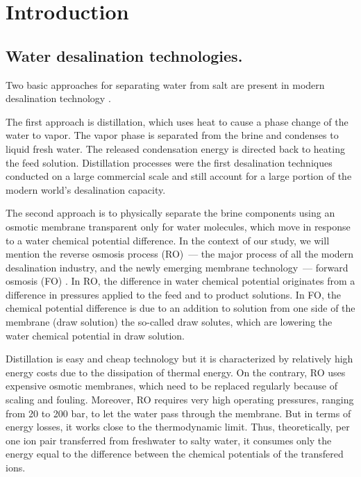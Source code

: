 \documentclass[journal,article,submit,pdftex,moreauthors]{Definitions/mdpi}
\begin{document}




\section{Introduction\label{sec: intro}}
\subsection{Water desalination technologies.}
Two basic approaches for separating water from salt are present in modern desalination technology \cite{Miller2003,Curto2021}.

The first approach is distillation, which uses heat to cause a phase change of the water to vapor. The vapor phase is separated from the brine and condenses to liquid fresh water. 
The released condensation energy is directed back to heating the feed solution.
Distillation processes were the first desalination techniques conducted on a large commercial scale and still account for a large portion of the modern world’s desalination capacity.

The second approach is to physically separate the brine components using an osmotic membrane transparent only for water molecules, which move in response to a water chemical potential difference.
In the context of our study, we will mention the reverse osmosis process (RO)~--- the major process of all the modern desalination industry, and the newly emerging membrane
technology~--- forward osmosis (FO) \cite{Akther2015}. 
In RO, the difference in water chemical potential originates from a difference in pressures applied to the feed and to product solutions. 
In FO, the chemical potential difference is due to an addition to solution from one side of the membrane (draw solution) the so-called draw solutes, which are lowering the water chemical potential in draw solution.


Distillation is easy and cheap technology but it is characterized by relatively high energy costs due to the dissipation of thermal energy. 
On the contrary, RO uses expensive osmotic membranes, which need to be replaced regularly because of scaling and fouling. 
Moreover, RO requires very high operating pressures, ranging from 20 to 200 bar, to let the water pass through the membrane. 
But in terms of energy losses, it works close to the thermodynamic limit.
Thus, theoretically, per one ion pair transferred from freshwater to salty water, it consumes only the energy equal to the difference between the chemical potentials of the transfered ions.
\end{document}
